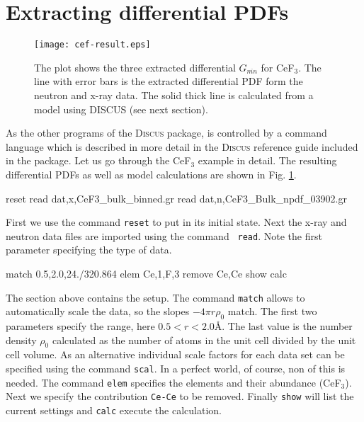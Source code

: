 \section{Extracting differential PDFs\label{s:exa:calc}}

\begin{figure}[!bt]
  \centering
  \texttt{[image: cef-result.eps]}
  \caption{The plot shows the three extracted differential 
  $G_{\overline{mn}}$ for CeF$_3$. The line with error bars is the
  extracted differential PDF form the neutron and x-ray data. The
  solid thick line is calculated from a model using DISCUS (see
  next section).}
  \label{f:res}
\end{figure}

As the other programs of the \textsc{Discus} package, \Mixscat is controlled by a command language which is described in more detail in the \textsc{Discus} reference guide included in the package. Let us go through the CeF$_3$ example in detail. The resulting differential PDFs as well as model calculations are shown in Fig. \ref{f:res}.

\begin{MacVerbatim}
 reset
 read dat,x,CeF3_bulk_binned.gr
 read dat,n,CeF3_Bulk_npdf_03902.gr
\end{MacVerbatim}

First we use the command {\tt reset} to put \Mixscat in its initial state. 
Next the x-ray and neutron data files are imported using the command {\tt 
read}. Note the first parameter specifying the type of data.

\begin{MacVerbatim}  
 match 0.5,2.0,24./320.864
 elem Ce,1,F,3
 remove Ce,Ce
 show
 calc
\end{MacVerbatim}

The section above contains the setup. The command {\tt match} allows to 
automatically scale the data, so the slopes $-4 \pi r \rho_0$ match. The 
first two parameters specify the range, here $0.5 < r < 2.0$\AA. The last 
value is the number density $\rho_0$ calculated as the number of atoms in 
the unit cell divided by the unit cell volume. As an alternative individual 
scale factors for each data set can be specified using the command {\tt scal}. 
In a perfect world, of course, non of this is needed. The command {\tt elem} 
specifies the elements and their abundance (CeF$_3$). Next we specify the 
contribution {\tt Ce-Ce} to be removed. Finally {\tt show} will list the 
current settings and {\tt calc} execute the calculation.

